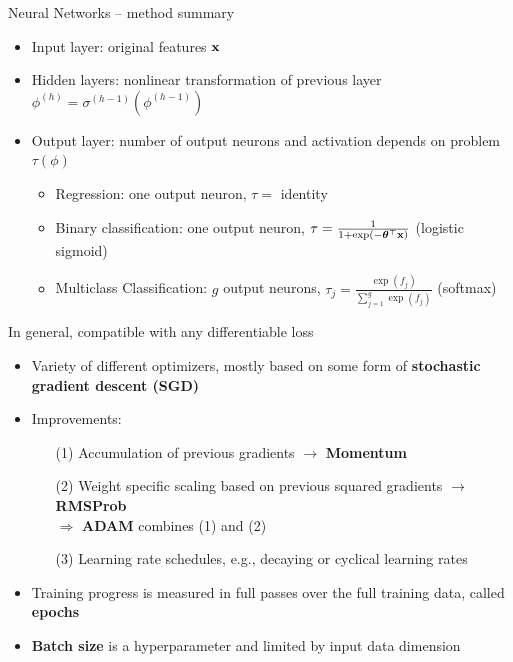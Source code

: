 \begin{frame}{Neural Networks -- method summary}

\footnotesize


\begin{itemize}
    \item Input layer: original features $\mathbf{x}$
    \item Hidden layers: nonlinear transformation of previous layer $\phi^{(h)} = \sigma^{(h - 1)}(\phi^{(h-1)})$
    \item Output layer: number of output neurons and activation depends on problem $\tau(\phi)$
    \begin{itemize}
    \item Regression: one output neuron, $\tau = $ identity
    \item Binary classification: one output neuron, $\tau = \frac{1}{1 + \exp(- \bm{\theta}^\top \mathbf{x})}$ (logistic sigmoid)
    \item Multiclass Classification: $g$ output neurons, $\tau_j = \frac{\exp(f_j)}{\sum_{j=1}^g \exp(f_j)}$ (softmax)
\end{itemize}
\end{itemize}


 In general, compatible with any differentiable loss

\medskip


\begin{itemize}
  \item Variety of different optimizers, mostly based on some form of 
  \textbf{stochastic gradient descent (SGD)}\\
  \item Improvements: 
    \begin{itemize}
        \item[(1)] Accumulation of previous gradients $\rightarrow$ \textbf{Momentum}
        \item[(2)] Weight specific scaling based on previous squared gradients $\rightarrow$ \textbf{RMSProb}\\
        $\Rightarrow$ \textbf{ADAM} combines (1) and (2) 
        \item[(3)] Learning rate schedules, e.g., decaying or cyclical learning rates
    \end{itemize}
    \item Training progress is measured in full passes over the full training data, called \textbf{epochs}
    \item \textbf{Batch size} is a hyperparameter and limited by input data dimension
\end{itemize}

\end{frame}


